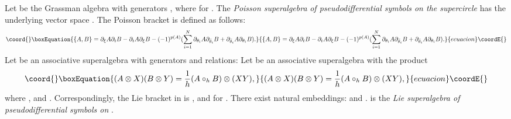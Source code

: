 \documentclass[a4paper,a4paper]{article}
\begin{document}
Let \coordHE{} be
the Grassman algebra with generators
\coordHE{},
where \coordHE{} for \coordHE{}.
The {\it Poisson superalgebra} \coordHE{} {\it of 
pseudodifferential symbols on the supercircle}   \coordHE{} 
has the underlying vector space
\coordHE{}.
The Poisson bracket is defined as follows:
\begin{equation}\coord{}\boxEquation{
\lbrace A, B \rbrace = 
\partial_{\xi}A\partial_{t}B -
\partial_tA\partial_{\xi}B - (-1)^{p(A)}
(\sum_{i=1}^N\partial_{\theta_i}A\partial_ {\bar{\theta}_i}B
+ \partial_ {\bar{\theta}_i}A\partial_{\theta_i}B).
}{
\lbrace A, B \rbrace = 
\partial_{\xi}A\partial_{t}B -
\partial_tA\partial_{\xi}B - (-1)^{p(A)}
(\sum_{i=1}^N\partial_{\theta_i}A\partial_ {\bar{\theta}_i}B
+ \partial_ {\bar{\theta}_i}A\partial_{\theta_i}B).
}{ecuacion}\coordE{}\end{equation}
Let \coordHE{} be an associative superalgebra
with generators
\coordHE{}
and relations: 
\coordHE{}
Let
\coordHE{}
be an associative superalgebra with the product
\begin{equation}\coord{}\boxEquation{
(A \otimes X) (B \otimes  Y) = \frac {1}{h}(A\circ_h B)\otimes (X Y),
}{
(A \otimes X) (B \otimes  Y) = \frac {1}{h}(A\circ_h B)\otimes (X Y),
}{ecuacion}\coordE{}\end{equation}
where \coordHE{}, and \coordHE{}.
Correspondingly, the Lie bracket in \coordHE{} is
\coordHE{},
and \coordHE{}
for \coordHE{}.
There exist natural embeddings:
\coordHE{} and \coordHE{}.
\coordHE{} is the {\it Lie superalgebra of 
pseudodifferential symbols on}   \coordHE{}.
\end{document}
